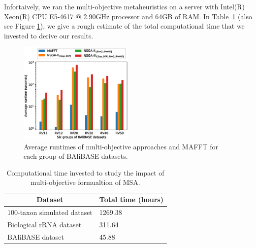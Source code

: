 Infortaively, we ran the multi-objective metaheuristics on a server with Intel(R) Xeon(R) CPU E5-4617 @ 2.90GHz processor and 64GB of RAM. In Table~\ref{tab:time} (also see Figure \ref{fig:runtime_comp}), we give a rough estimate of the total computational time that we invested to derive our results.



\begin{figure}[!htbp] 
	\centering
	\includegraphics[width=0.5\textwidth]{Figure/balibase_runtime_comparison}
	\caption{Average runtimes of multi-objective approaches and MAFFT for each group of BAliBASE datasets.} 
	\label{fig:runtime_comp}
\end{figure}


\begin{table}[htbp]
	\small
	\centering
	\caption{Computational time invested to study the impact of multi-objective formualtion of MSA.}
	\begin{tabular}{|l|l|}
		\hline 
		\multicolumn{1}{|c|}{Dataset} & \multicolumn{1}{c|}{Total time (hours)} \\ 
		\hline 
		100-taxon simulated dataset &  1269.38\\ 
		\hline 
		Biological rRNA dataset &  311.64\\ 
		\hline 
		BAliBASE dataset &  45.88\\ 
		\hline 
	\end{tabular} 
	\label{tab:time}%
\end{table}%



